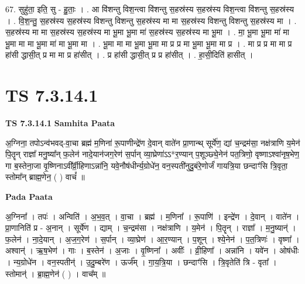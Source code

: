 \documentclass[17pt]{extarticle}
\begin{document}
67. सुहु॑ता॒ इति॒ सु - हु॒ताः॒ । . आ वि॑शन्तु विश॒न्त्वा वि॑शन्तु स॒हस्र॑स्य स॒हस्र॑स्य विश॒न्त्वा वि॑शन्तु स॒हस्र॑स्य । . वि॒श॒न्तु॒ स॒हस्र॑स्य स॒हस्र॑स्य विशन्तु विशन्तु स॒हस्र॑स्य मा मा स॒हस्र॑स्य विशन्तु विशन्तु स॒हस्र॑स्य मा । . स॒हस्र॑स्य मा मा स॒हस्र॑स्य स॒हस्र॑स्य मा भू॒मा भू॒मा मा॑ स॒हस्र॑स्य स॒हस्र॑स्य मा भू॒मा । . मा॒ भू॒मा भू॒मा मा॑ मा भू॒मा मा मा भू॒मा मा॑ मा भू॒मा मा । . भू॒मा मा मा भू॒मा भू॒मा मा प्र प्र मा भू॒मा भू॒मा मा प्र । . मा प्र प्र मा मा प्र हा॑सी द्धासी॒त् प्र मा मा प्र हा॑सीत् । . प्र हा॑सी द्धासी॒त् प्र प्र हा॑सीत् । . हा॒सी॒दिति॑ हासीत् । \newline
\pagebreak
{}

\section{ TS 7.3.14.1 }

\textbf{TS 7.3.14.1 } \newline
\textbf{Samhita Paata} \newline

अ॒ग्निना॒ तपोऽन्व॑भवद्-वा॒चा ब्रह्म॑ म॒णिना॑ रू॒पाणीन्द्रे॑ण दे॒वान् वाते॑न प्रा॒णान्थ् सूर्ये॑ण॒ द्यां च॒न्द्रम॑सा॒ नक्ष॑त्राणि य॒मेन॑ पि॒तॄन् राज्ञा᳚ मनु॒ष्या᳚न् फ॒लेन॑ नादे॒यान॑जग॒रेण॑ स॒र्पान् व्या॒घ्रेणा॑ऽऽ*र॒ण्यान् प॒शूञ्छ्ये॒नेन॑ पत॒त्रिणो॒ वृष्णाऽश्वा॑नृष॒भेण॒ गा ब॒स्तेना॒जा वृ॒ष्णिनाऽवी᳚र्व्री॒हिणाऽन्ना॑नि॒ यवे॒नौष॑धीर्न्य॒ग्रोधे॑न॒ वन॒स्पती॑नुदु॒बंरे॒णोर्जं॑ गायत्रि॒या छन्दाꣳ॑सि त्रि॒वृता॒ स्तोमा᳚न् ब्राह्म॒णेन॒ ( ) वाचं᳚ ॥ \newline

\textbf{Pada Paata} \newline

अ॒ग्निना᳚ । तपः॑ । अन्विति॑ । अ॒भ॒व॒त् । वा॒चा । ब्रह्म॑ । म॒णिना᳚ । रू॒पाणि॑ । इन्द्रे॑ण । दे॒वान् । वाते॑न । प्रा॒णानिति॑ प्र - अ॒नान् । सूर्ये॑ण । द्याम् । च॒न्द्रम॑सा । नक्ष॑त्राणि । य॒मेन॑ । पि॒तॄन् । राज्ञा᳚ । म॒नु॒ष्यान्॑ । फ॒लेन॑ । ना॒दे॒यान् । अ॒ज॒ग॒रेण॑ । स॒र्पान् । व्या॒घ्रेण॑ । आ॒र॒ण्यान् । प॒शून् । श्ये॒नेन॑ । प॒त॒त्रिणः॑ । वृष्णा᳚ । अश्वान्॑ । ऋ॒ष॒भेण॑ । गाः । ब॒स्तेन॑ । अ॒जाः । वृ॒ष्णिना᳚ । अवीः᳚ । व्री॒हिणा᳚ । अन्ना॑नि । यवे॑न । ओष॑धीः । न्य॒ग्रोधे॑न । वन॒स्पतीन्॑ । उ॒दु॒म्बरे॑ण । ऊर्ज᳚म् । गा॒य॒त्रि॒या । छन्दाꣳ॑सि । त्रि॒वृतेति॑ त्रि - वृता᳚ । स्तोमान्॑ । ब्रा॒ह्म॒णेन॑ ( ) । वाच᳚म् ॥  \newline
\end{document}
